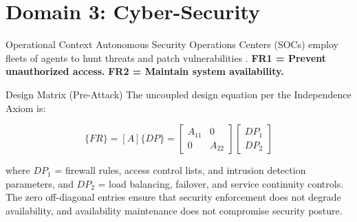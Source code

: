 \documentclass[
  ignorenonframetext,
]{beamer}
\author{\texorpdfstring{}{}}
\date{}
\begin{document}
\section{Domain 3: Cyber-Security}\label{sec:domain_cyber_security}

\begin{frame}[allowframebreaks]{Operational Context}
\protect{}\label{operational-context}
Autonomous Security Operations Centers (SOCs) employ fleets of agents to
hunt threats and patch vulnerabilities
\cite{nist2018framework, kaloudi2020ai}. \textbf{FR1 = Prevent
unauthorized access.} \textbf{FR2 = Maintain system availability.}

\begin{block}{Design Matrix (Pre-Attack)}
\protect{}\label{design-matrix-pre-attack}
The uncoupled design equation per the Independence Axiom
\cite{suh2001axiomatic} is:

\begin{equation}
\{FR\} = [A]\{DP\} = \begin{bmatrix} A_{11} & 0 \\ 0 & A_{22} \end{bmatrix} \begin{bmatrix} DP_1 \\ DP_2 \end{bmatrix}
\label{eq:cyber_security_baseline}
\end{equation}

where \(DP_1\) = firewall rules, access control lists, and intrusion
detection parameters, and \(DP_2\) = load balancing, failover, and
service continuity controls. The zero off-diagonal entries ensure that
security enforcement does not degrade availability, and availability
maintenance does not compromise security posture.
\end{block}
\end{frame}
\end{document}

